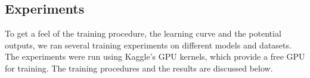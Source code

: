 \begingroup
\let\clearpage\relax
\subsection{Experiments}
\label{sec:experiments}
To get a feel of the training procedure, the learning curve and the potential outputs, we ran several training experiments on different models and datasets.
The experiments were run using Kaggle's GPU kernels, which provide a free GPU for training. The training procedures and the results are discussed below.






\endgroup